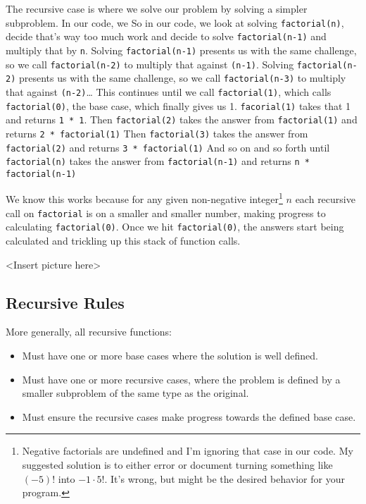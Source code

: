 The recursive case is where we solve our problem by solving a simpler subproblem.
In our code, we
So in our code, we look at solving \texttt{factorial(n)}, decide that's way too much work and decide to solve \texttt{factorial(n-1)} and multiply that by \texttt{n}.
Solving \texttt{factorial(n-1)} presents us with the same challenge, so we call \texttt{factorial(n-2)} to multiply that against \texttt{(n-1)}.  
Solving \texttt{factorial(n-2)} presents us with the same challenge, so we call \texttt{factorial(n-3)} to multiply that against \texttt{(n-2)}\dots  
This continues until we call \texttt{factorial(1)}, which calls \texttt{factorial(0)}, the base case, which finally gives us 1.  \texttt{facorial(1)} takes that 1 and returns \texttt{1 * 1}. 
Then \texttt{factorial(2)} takes the answer from \texttt{factorial(1)} and returns \texttt{2 * \texttt{factorial(1)}}
Then \texttt{factorial(3)} takes the answer from \texttt{factorial(2)} and returns \texttt{3 * \texttt{factorial(1)}}
And so on and so forth until \texttt{factorial(n)} takes the answer from \texttt{factorial(n-1)} and returns \texttt{n * \texttt{factorial(n-1)}}

We know this works because for any given non-negative integer\footnote{Negative factorials are undefined and I'm ignoring that case in our code. My suggested solution is to either error or document turning something like $(-5)!$ into $-1 \cdot 5!$.  It's wrong, but might be the desired behavior for your program.} $n$  each recursive call on \texttt{factorial} is on a smaller and smaller number, making progress to calculating \texttt{factorial(0)}. Once we hit \texttt{factorial(0)}, the answers start being calculated and trickling up this stack of function calls.


<Insert picture here>


\subsection{Recursive Rules}

More generally, all recursive functions:
\begin{itemize}
	\item Must have one or more base cases where the solution is well defined.
	\item Must have one or more recursive cases, where the problem is defined by a smaller subproblem of the same type as the original.
	\item Must ensure the recursive cases make progress towards the defined base case.
\end{itemize}


